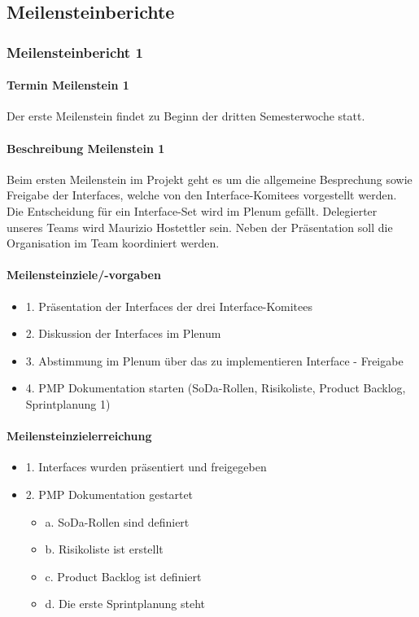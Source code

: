 \documentclass[11pt]{article}
\begin{document}
\subsection{Meilensteinberichte}
\subsubsection{Meilensteinbericht 1}
\paragraph{Termin Meilenstein 1}
Der erste Meilenstein findet zu Beginn der dritten Semesterwoche statt.
\paragraph{Beschreibung Meilenstein 1}
Beim ersten Meilenstein im Projekt geht es um die allgemeine Besprechung sowie Freigabe der
Interfaces, welche von den Interface-Komitees vorgestellt werden. Die Entscheidung für ein
Interface-Set wird im Plenum gefällt. Delegierter unseres Teams wird Maurizio Hostettler sein. Neben
der Präsentation soll die Organisation im Team koordiniert werden.
\paragraph{Meilensteinziele/-vorgaben}
\begin{itemize}
	\itemsep0pt
	\item 1. Präsentation der Interfaces der drei Interface-Komitees
	\item 2. Diskussion der Interfaces im Plenum
	\item 3. Abstimmung im Plenum über das zu implementieren Interface - Freigabe
	\item 4. PMP Dokumentation starten (SoDa-Rollen, Risikoliste, Product Backlog, Sprintplanung 1)
\end{itemize}

\paragraph{Meilensteinzielerreichung}
\begin{itemize}
	\itemsep0pt
	\item 1. Interfaces wurden präsentiert und freigegeben
	\item 2. PMP Dokumentation gestartet
	\begin{itemize}
		\itemsep0pt
		\item a. SoDa-Rollen sind definiert
		\item b. Risikoliste ist erstellt
		\item c. Product Backlog ist definiert
		\item d. Die erste Sprintplanung steht
	\end{itemize}
\end{itemize}
\end{document}
